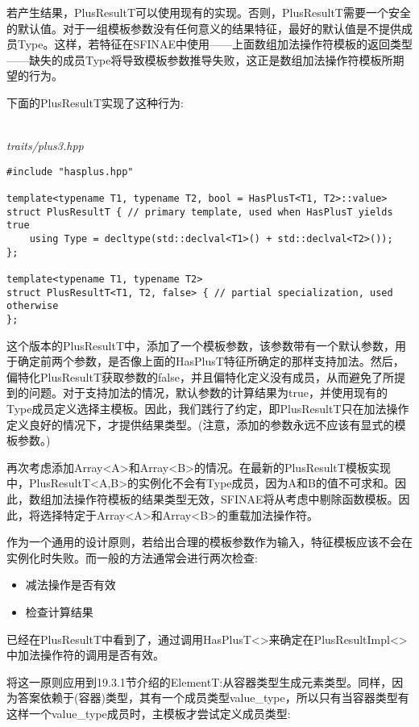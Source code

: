 若产生结果，PlusResultT可以使用现有的实现。否则，PlusResultT需要一个安全的默认值。对于一组模板参数没有任何意义的结果特征，最好的默认值是不提供成员Type。这样，若特征在SFINAE中使用——上面数组加法操作符模板的返回类型——缺失的成员Type将导致模板参数推导失败，这正是数组加法操作符模板所期望的行为。

下面的PlusResultT实现了这种行为:

\hspace*{\fill} \\ %
\noindent
\textit{traits/plus3.hpp}
\begin{lstlisting}[style=styleCXX]
#include "hasplus.hpp"

template<typename T1, typename T2, bool = HasPlusT<T1, T2>::value>
struct PlusResultT { // primary template, used when HasPlusT yields true
	using Type = decltype(std::declval<T1>() + std::declval<T2>());
};

template<typename T1, typename T2>
struct PlusResultT<T1, T2, false> { // partial specialization, used otherwise
};
\end{lstlisting}

这个版本的PlusResultT中，添加了一个模板参数，该参数带有一个默认参数，用于确定前两个参数，是否像上面的HasPlusT特征所确定的那样支持加法。然后，偏特化PlusResultT获取参数的false，并且偏特化定义没有成员，从而避免了所提到的问题。对于支持加法的情况，默认参数的计算结果为true，并使用现有的Type成员定义选择主模板。因此，我们践行了约定，即PlusResultT只在加法操作定义良好的情况下，才提供结果类型。(注意，添加的参数永远不应该有显式的模板参数。)

再次考虑添加Array<A>和Array<B>的情况。在最新的PlusResultT模板实现中，PlusResultT<A,B>的实例化不会有Type成员，因为A和B的值不可求和。因此，数组加法操作符模板的结果类型无效，SFINAE将从考虑中剔除函数模板。因此，将选择特定于Array<A>和Array<B>的重载加法操作符。

作为一个通用的设计原则，若给出合理的模板参数作为输入，特征模板应该不会在实例化时失败。而一般的方法通常会进行两次检查:

\begin{itemize}
\item
减法操作是否有效

\item
检查计算结果
\end{itemize}

已经在PlusResultT中看到了，通过调用HasPlusT<>来确定在PlusResultImpl<>中加法操作符的调用是否有效。

将这一原则应用到19.3.1节介绍的ElementT:从容器类型生成元素类型。同样，因为答案依赖于(容器)类型，其有一个成员类型value\_type，所以只有当容器类型有这样一个value\_type成员时，主模板才尝试定义成员类型:

